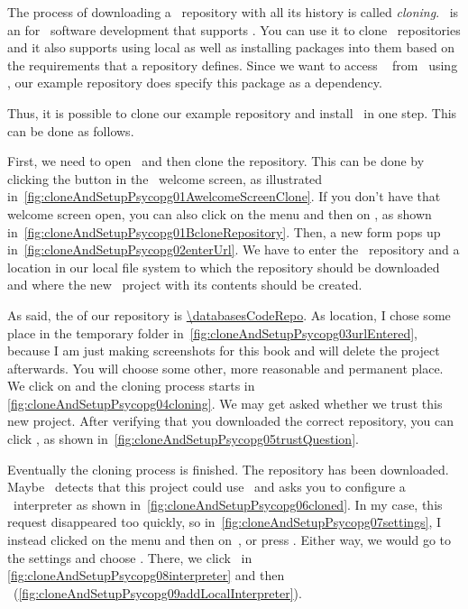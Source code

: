 The process of downloading a \git\ repository with all its history is called \emph{cloning}.
\pycharm\ is an  for \python\ software development that supports \git.
You can use it to clone \git\ repositories and it also supports using local  as well as installing packages into them based on the requirements that a repository defines.
Since we want to access \postgresql\  from \python\ using \psycopg, our example repository does specify this package as a dependency.

Thus, it is possible to clone our example repository and install \psycopg\ in one step.
This can be done as follows.

First, we need to open \pycharm\ and then clone the repository.
This can be done by clicking the  button in the \pycharm\ welcome screen, as illustrated in~\cref{fig:cloneAndSetupPsycopg01AwelcomeScreenClone}.
If you don't have that welcome screen open, you can also click on the  menu and then on , as shown in~\cref{fig:cloneAndSetupPsycopg01BcloneRepository}.
Then, a new form pops up in~\cref{fig:cloneAndSetupPsycopg02enterUrl}.
We have to enter the \git\ repository  and a location in our local file system to which the repository should be downloaded and where the new \pycharm\ project with its contents should be created.

As said, the  of our repository is \expandafter\url{\databasesCodeRepo}.
As location, I chose some place in the temporary folder in~\cref{fig:cloneAndSetupPsycopg03urlEntered}, because I am just making screenshots for this book and will delete the project afterwards.
You will choose some other, more reasonable and permanent place.
We click on  and the cloning process starts in \cref{fig:cloneAndSetupPsycopg04cloning}.
We may get asked whether we trust this new project.
After verifying that you downloaded the correct repository, you can click , as shown in~\cref{fig:cloneAndSetupPsycopg05trustQuestion}.

Eventually the cloning process is finished.
The repository has been downloaded.
Maybe \pycharm\ detects that this project could use \python\ and asks you to configure a \python\ interpreter as shown in~\cref{fig:cloneAndSetupPsycopg06cloned}.
In my case, this request disappeared too quickly, so in~\cref{fig:cloneAndSetupPsycopg07settings}, I instead clicked on the  menu and then on~, or press .
Either way, we would go to the  settings and choose .
There, we click~ in \cref{fig:cloneAndSetupPsycopg08interpreter} and then ~(\cref{fig:cloneAndSetupPsycopg09addLocalInterpreter}).

